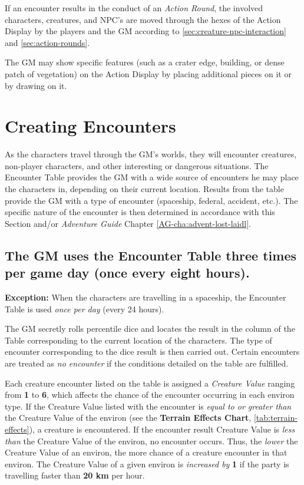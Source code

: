 If an encounter results in the conduct of an \emph{Action Round}, the
involved characters, creatures, and NPC's are moved through the hexes
of the Action Display by the players and the GM according to
\ref{sec:creature-npc-interaction} and \ref{sec:action-rounds}.

The GM may show specific features (such as a crater edge, building, or
dense patch of vegetation) on the Action Display by placing additional
pieces on it or by drawing on it.


\section{Creating Encounters}
\label{sec:creating-encounters}


As the characters travel through the GM's worlds, they will encounter
creatures, non-player characters, and other interesting or dangerous
situations. The Encounter Table provides the GM with a wide source of
encounters he may place the characters in, depending on their current
location. Results from the table provide the GM with a type of
encounter (spaceship, federal, accident, etc.).  The specific nature
of the encounter is then determined in accordance with this Section
and/or \emph{Adventure Guide} Chapter \ref{AG-cha:advent-lost-laidl}.


\subsection[Encounters]{The GM uses the Encounter Table three
  times per game day (once every eight hours).} 
\label{sec:encounters}



\textbf{Exception:} When the characters are travelling in a spaceship, the
Encounter Table is used \emph{once per day} (every 24 hours).

The GM secretly rolls percentile dice and locates the result in the
column of the Table corresponding to the current location of the
characters. The type of encounter corresponding to the dice result is
then carried out. Certain encounters are treated as \emph{no
  encounter} if the conditions detailed on the table are fulfilled.

Each creature encounter listed on the table is assigned a
\emph{Creature Value} ranging from \textbf{1} to \textbf{6}, which
affects the chance of the encounter occurring in each environ type. If
the Creature Value listed with the encounter is \emph{equal to or
  greater than} the Creature Value of the environ (see the
\textbf{Terrain Effects Chart}, \ref{tab:terrain-effects}), a creature is
encountered. If the encounter result Creature Value is \emph{less
  than} the Creature Value of the environ, no encounter occurs. Thus,
the \emph{lower} the Creature Value of an environ, the more chance of
a creature encounter in that environ. The Creature Value of a given
environ is \emph{increased by} \textbf{1} if the party is travelling
faster than \textbf{20 km} per hour.

